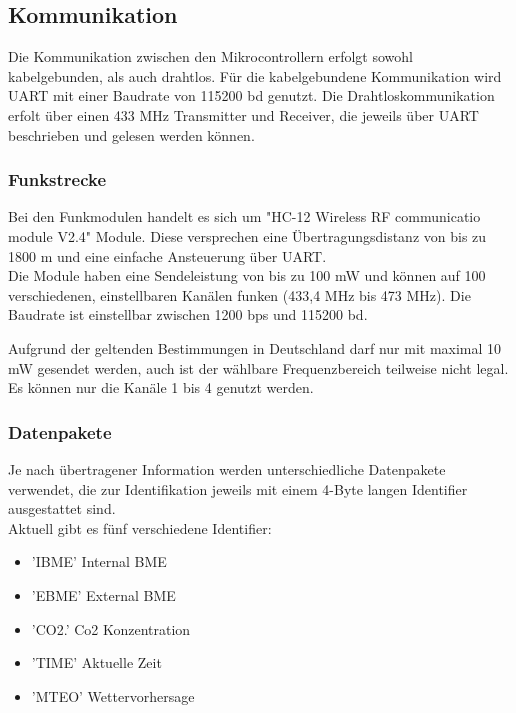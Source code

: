 \documentclass[a4paper,11pt]{article}
\begin{document}
\subsection{Kommunikation}
\label{subsub:kommunikation}

Die Kommunikation zwischen den Mikrocontrollern erfolgt sowohl kabelgebunden, als auch drahtlos. Für die kabelgebundene Kommunikation wird UART mit einer Baudrate
von 115200 bd genutzt. Die Drahtloskommunikation erfolt über einen 433 MHz Transmitter und Receiver, die jeweils über UART beschrieben und gelesen werden können. 

\subsubsection{Funkstrecke}
\label{subsubsub:funkstrecke}

Bei den Funkmodulen handelt es sich um "HC-12 Wireless RF communicatio module V2.4" Module. Diese versprechen eine Übertragungsdistanz von bis zu 1800 m
und eine einfache Ansteuerung über UART. \\
Die Module haben eine Sendeleistung von bis zu 100 mW und können auf 100 verschiedenen, einstellbaren Kanälen funken (433,4 MHz bis 473 MHz). Die Baudrate ist einstellbar
zwischen 1200 bps und 115200 bd. 

\vspace{0.5cm}
\noindent
Aufgrund der geltenden Bestimmungen in Deutschland darf nur mit maximal 10 mW gesendet werden, auch ist der wählbare Frequenzbereich teilweise nicht legal.
Es können nur die Kanäle 1 bis 4 genutzt werden. 

\subsubsection{Datenpakete}
\label{subsubsub:datenpakete}

Je nach übertragener Information werden unterschiedliche Datenpakete verwendet, die zur Identifikation jeweils mit einem 4-Byte langen Identifier ausgestattet sind. \\
Aktuell gibt es fünf verschiedene Identifier:
\begin{itemize}
  \item 'IBME' Internal BME
  \item 'EBME' External BME
  \item 'CO2.' Co2 Konzentration
  \item 'TIME' Aktuelle Zeit
  \item 'MTEO' Wettervorhersage
\end{itemize}
\end{document}
